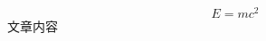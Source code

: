 \documentclass{article}
\begin{document}
   \begin{equation}
   E = mc^{2}
   \end{equation}
文章内容
\end{document}

